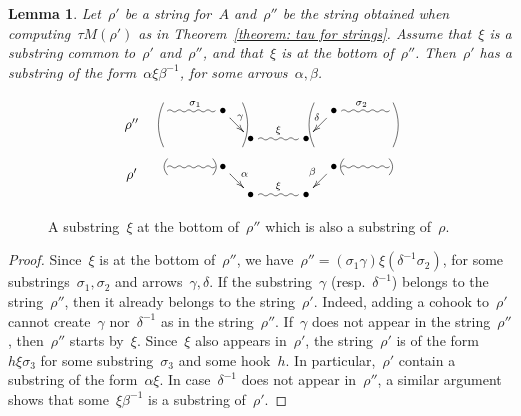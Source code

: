 \documentclass{amsart}
\newtheorem{lemma}[theorem]{Lemma}
\theoremstyle{definition}
\begin{document}
\begin{lemma}\label{lem:xiEqualsNu}
Let~$\rho'$ be a string for~$A$ and~$\rho''$ be the string obtained when computing~$\tau M(\rho')$ as in Theorem~\ref{theorem: tau for strings}.
Assume that~$\xi$ is a substring common to~$\rho'$ and~$\rho''$, and that~$\xi$ is at the bottom of~$\rho''$.
Then~$\rho'$ has a substring of the form~$\alpha\xi\beta^{-1}$, for some arrows~$\alpha, \beta$.
\end{lemma}

\begin{figure}[h]
 	\capstart
\[
\xy
%
(-37,10.5)*+{\rho''};
(-28,14)="-14";
(-14,14)*+{\bullet}="-12";
(-7,7)*+{\bullet}="-11";
(7,7)*+{\bullet}="11";
(14,14)*+{\bullet}="12";
(28,14)="14";
%
{\ar@{~}^{\sigma_1} "-14";"-12"};
{\ar^{\!\!\gamma} "-12";"-11"};
{\ar@{~}^{\xi} "-11";"11"};
{\ar_{\delta\!\!} "12";"11"};
{\ar@{~}^{\sigma_2} "12";"14"};
%
{\ar@/^.3pc/@{-} (-29,5);(-29,16)};
{\ar@/_.3pc/@{-} (-9,5);(-9,16)};
%
{\ar@/^.3pc/@{-} (9,5);(9,16)};
{\ar@/_.3pc/@{-} (29,5);(29,16)};
%
%
%
(-37,-2)*+{\rho'};
(-28,0)="-4";
(-14,0)*+{\bullet}="-2";
(-7,-7)*+{\bullet}="-1";
(7,-7)*+{\bullet}="1";
(14,0)*+{\bullet}="2";
(28,0)="4";
%
{\ar@{~} "-4";"-2"};
{\ar^{\alpha} "-2";"-1"};
{\ar@{~}^{\xi} "-1";"1"};
{\ar_{\beta} "2";"1"};
{\ar@{~} "2";"4"};
%
{\ar@/^.2pc/@{-} (-28,-2);(-28,2)};
{\ar@/_.2pc/@{-} (-16.5,-2);(-16.5,2)};
%
{\ar@/_.2pc/@{-} (28,-2);(28,2)};
{\ar@/^.2pc/@{-} (16.5,-2);(16.5,2)};
%
\endxy
\]
    \caption{A substring~$\xi$ at the bottom of~$\rho''$ which is also a substring of~$\rho$.}
    \label{fig: xi equals nu}
    \vspace{-.3cm}
\end{figure}

\begin{proof}
 Since~$\xi$ is at the bottom of~$\rho''$, we have~$\rho''=(\sigma_1\gamma)\xi(\delta^{-1}\sigma_2)$, for some substrings~$\sigma_1,\sigma_2$ and arrows~$\gamma,\delta$.
 If the substring~$\gamma$ (resp.~$\delta^{-1}$) belongs to the string~$\rho''$, then it already belongs to the string~$\rho'$.
 Indeed, adding a cohook to~$\rho'$ cannot create~$\gamma$ nor~$\delta^{-1}$ as in the string~$\rho''$.
 If~$\gamma$ does not appear in the string~$\rho''$, then~$\rho''$ starts by~$\xi$.
 Since~$\xi$ also appears in~$\rho'$, the string~$\rho'$ is of the form~$h\xi\sigma_3$ for some substring~$\sigma_3$ and some hook~$h$.
 In particular,~$\rho'$ contain a substring of the form~$\alpha\xi$.
 In case~$\delta^{-1}$ does not appear in~$\rho''$, a similar argument shows that some~$\xi\beta^{-1}$ is a substring of~$\rho'$.
\end{proof}
\end{document}
